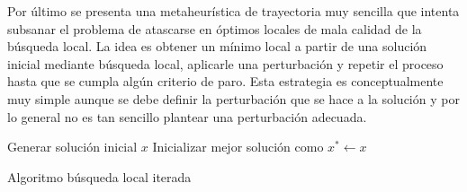 \smallskip
Por último se presenta una metaheurística de trayectoria muy sencilla que intenta subsanar el problema de atascarse en óptimos locales de mala calidad de la búsqueda local. La idea es obtener un mínimo local a partir de una solución inicial mediante búsqueda local, aplicarle una perturbación y repetir el proceso hasta que se cumpla algún criterio de paro. Esta estrategia es conceptualmente muy simple aunque se debe definir la perturbación que se hace a la solución y por lo general no es tan sencillo plantear una perturbación adecuada.\\

\begin{algorithm}[H]
 Generar solución inicial $x$\;
 Inicializar mejor solución como $x^*\leftarrow x$
    \label{alg:ILS}
    \caption{Algoritmo búsqueda local iterada}
\end{algorithm}
